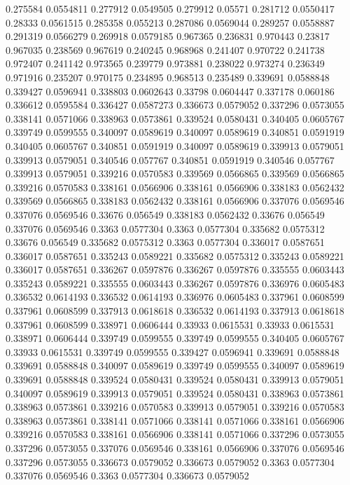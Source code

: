 0.275584 0.0554811
0.277912 0.0549505
0.279912 0.05571
0.281712 0.0550417
0.28333 0.0561515
0.285358 0.055213
0.287086 0.0569044
0.289257 0.0558887
0.291319 0.0566279
0.269918 0.0579185
0.967365 0.236831
0.970443 0.23817
0.967035 0.238569
0.967619 0.240245
0.968968 0.241407
0.970722 0.241738
0.972407 0.241142
0.973565 0.239779
0.973881 0.238022
0.973274 0.236349
0.971916 0.235207
0.970175 0.234895
0.968513 0.235489
0.339691 0.0588848
0.339427 0.0596941
0.338803 0.0602643
0.33798 0.0604447
0.337178 0.060186
0.336612 0.0595584
0.336427 0.0587273
0.336673 0.0579052
0.337296 0.0573055
0.338141 0.0571066
0.338963 0.0573861
0.339524 0.0580431
0.340405 0.0605767
0.339749 0.0599555
0.340097 0.0589619
0.340097 0.0589619
0.340851 0.0591919
0.340405 0.0605767
0.340851 0.0591919
0.340097 0.0589619
0.339913 0.0579051
0.339913 0.0579051
0.340546 0.057767
0.340851 0.0591919
0.340546 0.057767
0.339913 0.0579051
0.339216 0.0570583
0.339569 0.0566865
0.339569 0.0566865
0.339216 0.0570583
0.338161 0.0566906
0.338161 0.0566906
0.338183 0.0562432
0.339569 0.0566865
0.338183 0.0562432
0.338161 0.0566906
0.337076 0.0569546
0.337076 0.0569546
0.33676 0.056549
0.338183 0.0562432
0.33676 0.056549
0.337076 0.0569546
0.3363 0.0577304
0.3363 0.0577304
0.335682 0.0575312
0.33676 0.056549
0.335682 0.0575312
0.3363 0.0577304
0.336017 0.0587651
0.336017 0.0587651
0.335243 0.0589221
0.335682 0.0575312
0.335243 0.0589221
0.336017 0.0587651
0.336267 0.0597876
0.336267 0.0597876
0.335555 0.0603443
0.335243 0.0589221
0.335555 0.0603443
0.336267 0.0597876
0.336976 0.0605483
0.336532 0.0614193
0.336532 0.0614193
0.336976 0.0605483
0.337961 0.0608599
0.337961 0.0608599
0.337913 0.0618618
0.336532 0.0614193
0.337913 0.0618618
0.337961 0.0608599
0.338971 0.0606444
0.33933 0.0615531
0.33933 0.0615531
0.338971 0.0606444
0.339749 0.0599555
0.339749 0.0599555
0.340405 0.0605767
0.33933 0.0615531
0.339749 0.0599555
0.339427 0.0596941
0.339691 0.0588848
0.339691 0.0588848
0.340097 0.0589619
0.339749 0.0599555
0.340097 0.0589619
0.339691 0.0588848
0.339524 0.0580431
0.339524 0.0580431
0.339913 0.0579051
0.340097 0.0589619
0.339913 0.0579051
0.339524 0.0580431
0.338963 0.0573861
0.338963 0.0573861
0.339216 0.0570583
0.339913 0.0579051
0.339216 0.0570583
0.338963 0.0573861
0.338141 0.0571066
0.338141 0.0571066
0.338161 0.0566906
0.339216 0.0570583
0.338161 0.0566906
0.338141 0.0571066
0.337296 0.0573055
0.337296 0.0573055
0.337076 0.0569546
0.338161 0.0566906
0.337076 0.0569546
0.337296 0.0573055
0.336673 0.0579052
0.336673 0.0579052
0.3363 0.0577304
0.337076 0.0569546
0.3363 0.0577304
0.336673 0.0579052
